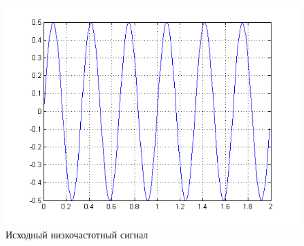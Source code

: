 \documentclass[10pt,a4paper]{article}
\begin{document}
\begin{figure}[h]
\centering
\includegraphics[width=12cm]{am1_1.png} 
Исходный низкочастотный сигнал
\end{figure}
\FloatBarrier
\end{document}
